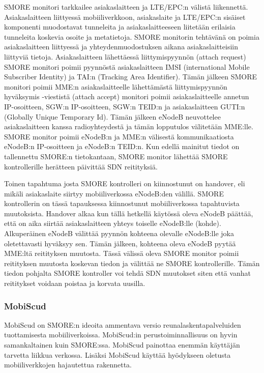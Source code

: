 \documentclass[finnish]{tktltiki2}
\theoremstyle{definition}
\theoremstyle{remark}
\begin{document}
SMORE monitori tarkkailee asiakaslaitteen ja LTE/EPC:n välistä liikennettä.
Asiakaslaitteen liittyessä mobiiliverkkoon, asiakaslaite ja LTE/EPC:n sisäiset komponenti muodostavat tunneleita ja asiakaslaitteeseen liitetään erilaisia tunneleita koskevia osoite ja metatietoja.
SMORE monitorin tehtävänä on poimia asiakaslaitteen liittyessä ja yhteydenmuodostuksen aikana asiakaslaitteisiin liittyviä tietoja.
Asiakaslaitteen lähettäessä liittymispyynnön (attach request) SMORE monitori poimii pyynnöstä asiakaslaitteen IMSI (international Mobile Subscriber Identity) ja TAI:n (Tracking Area Identifier). 
Tämän jälkeen SMORE monitori poimii MME:n asiakaslaitteelle lähettämästä liittymispyynnön hyväksymis -viestistä (attach accept) monitori poimii asiakaslaitteelle annetun IP-osoitteen, SGW:n IP-osoitteen, SGW:n TEID:n ja asiakaslaitteen GUTI:n (Globally Unique Temporary Id).
Tämän jälkeen eNodeB neuvottelee asiakaslaitteen kanssa radioyhteydestä ja tämän lopputulos välitetään MME:lle. SMORE monitor poimii eNodeB:n ja MME:n välisestä kommunikaatiosta eNodeB:n IP-osoitteen ja eNodeB:n TEID:n.
Kun edellä mainitut tiedot on tallennettu SMORE:n tietokantaan, SMORE monitor lähettää SMORE kontrollerille herätteen päivittää SDN reitityksiä. 

Toinen tapahtuma josta SMORE kontrolleri on kiinnostunut on handover, eli mikäli asiakaslaite siirtyy mobiiliverkossa eNodeB:den välillä. SMORE kontrollerin on tässä tapauksessa kiinnostunut mobiiliverkossa tapahtuvista muutoksista. 
Handover alkaa kun tällä hetkellä käytössä oleva eNodeB päättää, että on aika siirtää asiakaslaitteen yhteys toiselle eNodeB:lle (kohde).
Alkuperäinen eNodeB välittää pyynnön kohteena olevalle eNodeB:lle joka oletettavasti hyväksyy sen. Tämän jälkeen, kohteena oleva eNodeB pyytää MME:ltä reitityksen muutosta. Tässä välissä oleva SMORE monitor poimii reitityksen muutosta koskevan tiedon ja välittää ne SMORE kontrollerille.
Tämän tiedon pohjalta SMORE kontroller voi tehdä SDN muutokset siten että vanhat reititykset voidaan poistaa ja korvata uusilla.


\subsubsection{MobiScud}
MobiScud \cite{wang2015mobiscud} on SMORE:n ideoita ammentava versio reunalaskentapalveluiden tuottamisesta mobiiliverkoissa.
MobiScud:in perustoiminnallisuus on hyvin samankaltainen kuin SMORE:ssa. MobiScud painottaa enemmän käyttäjän tarvetta liikkua verkossa. Lisäksi MobiScud käyttää hyödykseen oletusta mobiiliverkkojen hajautettua rakennetta. 
\end{document}
